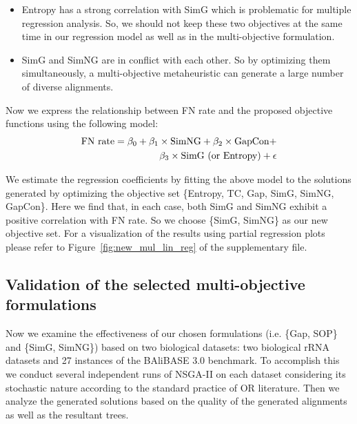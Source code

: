 \begin{itemize}
	\item Entropy has a strong correlation with SimG which is problematic for multiple regression analysis. So, we should not keep these two objectives at the same time in our regression model as well as in the multi-objective formulation.
	
	\item SimG and SimNG are in conflict with each other. So by optimizing them simultaneously, a multi-objective metaheuristic can generate a large number of diverse alignments.
\end{itemize}

Now we express the relationship between FN rate and the proposed objective functions using the following model:
\begin{equation}
\small
\begin{split}
\text{FN rate} = \beta_0 + \beta_1 \times \text{SimNG}+ \beta_2 \times \text{GapCon} + \\
\beta_3 \times \text{SimG (or Entropy)} + \epsilon \label{eq:new_multi_lin_reg}
\end{split}
\end{equation}

We estimate the regression coefficients by fitting the above model to the solutions generated by optimizing the objective set \{Entropy, TC, Gap, SimG, SimNG, GapCon\}. Here we find that, in each case, both SimG and SimNG exhibit a positive correlation with FN rate. So we choose \{SimG, SimNG\} as our new objective set. For a visualization of the results using partial regression plots please refer to Figure~\ref{fig:new_mul_lin_reg} of the supplementary file.


\subsection{Validation of the selected multi-objective formulations}%
Now we examine the effectiveness of our chosen formulations (i.e. \{Gap, SOP\} and \{SimG, SimNG\}) based on two biological datasets: two biological rRNA datasets and 27 instances of the BAliBASE 3.0 benchmark. To accomplish this we conduct several independent runs of NSGA-II on each dataset considering its stochastic nature according to the standard practice of OR literature. Then we analyze the generated solutions based on the quality of the generated alignments as well as the resultant trees.

